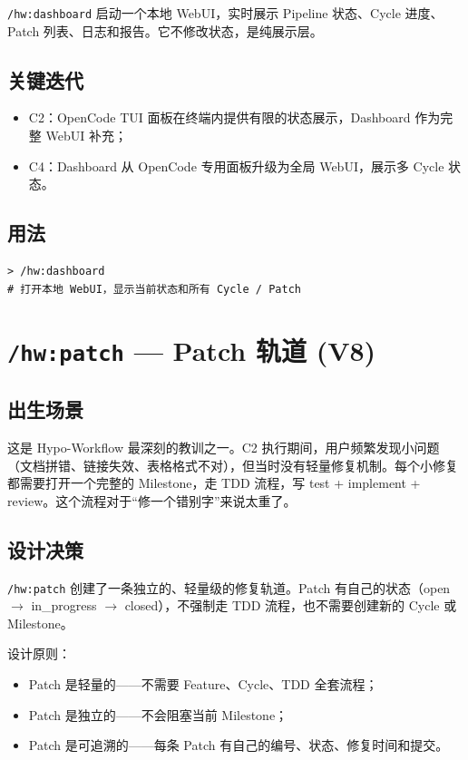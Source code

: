 \documentclass[
  outputdir=build,
  chapterstyle=cn,
  colorscheme=Simple,
  fontset=tech,
  code=false
]{Hypo-Note}
\begin{document}
\texttt{/hw:dashboard} 启动一个本地 WebUI，实时展示 Pipeline 状态、Cycle 进度、Patch 列表、日志和报告。它不修改状态，是纯展示层。

\subsection{关键迭代}

\begin{itemize}[leftmargin=2em]
  \item C2：OpenCode TUI 面板在终端内提供有限的状态展示，Dashboard 作为完整 WebUI 补充；
  \item C4：Dashboard 从 OpenCode 专用面板升级为全局 WebUI，展示多 Cycle 状态。
\end{itemize}

\subsection{用法}

\begin{lstlisting}[caption=启动 Dashboard]
> /hw:dashboard
# 打开本地 WebUI，显示当前状态和所有 Cycle / Patch
\end{lstlisting}

\section{\texttt{/hw:patch} — Patch 轨道 (V8)}

\subsection{出生场景}

这是 Hypo-Workflow 最深刻的教训之一。C2 执行期间，用户频繁发现小问题（文档拼错、链接失效、表格格式不对），但当时没有轻量修复机制。每个小修复都需要打开一个完整的 Milestone，走 TDD 流程，写 test + implement + review。这个流程对于“修一个错别字”来说太重了。

\subsection{设计决策}

\texttt{/hw:patch} 创建了一条独立的、轻量级的修复轨道。Patch 有自己的状态（open $\rightarrow$ in_progress $\rightarrow$ closed），不强制走 TDD 流程，也不需要创建新的 Cycle 或 Milestone。

设计原则：
\begin{itemize}[leftmargin=2em]
  \item Patch 是轻量的——不需要 Feature、Cycle、TDD 全套流程；
  \item Patch 是独立的——不会阻塞当前 Milestone；
  \item Patch 是可追溯的——每条 Patch 有自己的编号、状态、修复时间和提交。
\end{itemize}
\end{document}
